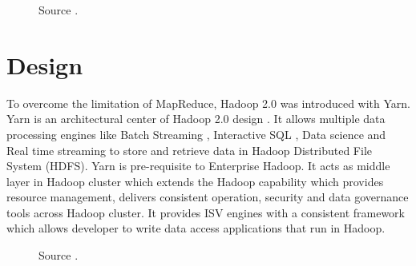 \documentclass[9pt,twocolumn,twoside]{../../styles/osajnl}
\begin{document}
\begin{figure}[htbp]
	\centering
	\caption{Source \cite{www-5}. }
	\label{fig:false-color}
\end{figure}

\section{Design}
To overcome the limitation of MapReduce, Hadoop 2.0 was introduced with Yarn. Yarn is an architectural center of Hadoop 2.0 design \cite{www-4}. It allows multiple data processing engines like Batch Streaming \CE, Interactive SQL \CE, Data science and Real time streaming to store and retrieve data in Hadoop Distributed File System (HDFS). Yarn is pre-requisite to Enterprise Hadoop. It acts as middle layer in Hadoop cluster which extends the Hadoop capability which provides resource management, delivers consistent operation, security and data governance tools across Hadoop cluster. It provides ISV
engines with a consistent framework which allows developer to write data access applications that run in Hadoop.

\begin{figure}[htbp]
	\centering
	\caption{Source \cite{www-4}. }
	\label{fig:false-color}
\end{figure}
\end{document}

